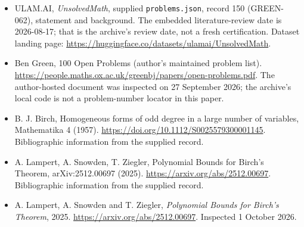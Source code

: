 \documentclass[11pt,a4paper]{article}
\begin{document}
{\small

\begin{itemize}

\item[\hypertarget{source:150:1}{S1}] ULAM.AI, \emph{UnsolvedMath}, supplied \texttt{problems.json}, record 150 (GREEN-062), statement and background. The embedded literature-review date is 2026-08-17; that is the archive’s review date, not a fresh certification. Dataset landing page: \url{https://huggingface.co/datasets/ulamai/UnsolvedMath}.

\item[\hypertarget{source:150:2}{S2}] Ben Green, 100 Open Problems (author’s maintained problem list). \url{https://people.maths.ox.ac.uk/greenbj/papers/open-problems.pdf}. The author-hosted document was inspected on 27 September 2026; the archive’s local code is not a problem-number locator in this paper.

\item[\hypertarget{source:150:3}{S3}] B. J. Birch, Homogeneous forms of odd degree in a large number of variables, Mathematika 4 (1957). \url{https://doi.org/10.1112/S0025579300001145}. Bibliographic information from the supplied record.

\item[\hypertarget{source:150:4}{S4}] A. Lampert, A. Snowden, T. Ziegler, Polynomial Bounds for Birch's Theorem, arXiv:2512.00697 (2025). \url{https://arxiv.org/abs/2512.00697}. Bibliographic information from the supplied record.

\item[E1] A. Lampert, A. Snowden and T. Ziegler, \emph{Polynomial Bounds for Birch's Theorem}, 2025. \url{https://arxiv.org/abs/2512.00697}. Inspected 1 October 2026.

\end{itemize}

}

\label{end:150}
\end{document}
